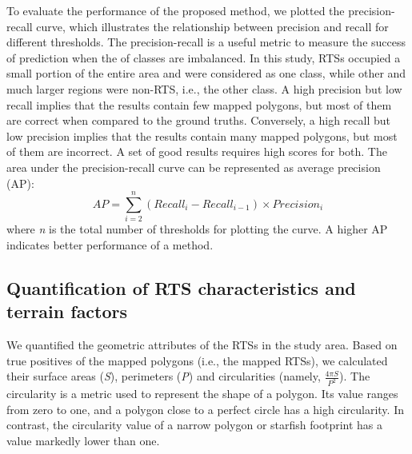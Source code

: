 \documentclass[authoryear,preprint,review,12pt]{elsarticle}
\begin{document}
To evaluate the performance of the proposed method, we plotted the precision-recall curve, which illustrates the relationship between precision and recall for different  thresholds. The precision-recall is a useful metric to measure the success of prediction when the  of classes are imbalanced. In this study, RTSs occupied a small portion of the entire area and were considered as one class, while other and much larger regions were non-RTS, i.e., the other class. A high precision but low recall implies that the results contain few mapped polygons, but most of them are correct when compared to the ground truths. Conversely, a high recall but low precision implies that the results contain many mapped polygons, but most of them are incorrect. A set of good results requires high scores for both. The area under the precision-recall curve can be represented as average precision (AP):
\begin{equation}
AP=\sum_{i=2}^{n} (Recall_i - Recall_{i-1})\times Precision_i 
\label{equ_ap}
\end{equation}
where \emph{n} is the total number of thresholds for plotting the curve. A higher AP indicates better performance of a method.


\subsection{Quantification of RTS characteristics and terrain factors}
\label{subsec_quantify_rts}

We quantified the geometric attributes of the RTSs in the study area. Based on true positives of the mapped polygons (i.e., the mapped RTSs), we calculated their surface areas (\emph{S}), perimeters (\emph{P}) and circularities (namely, $\frac{4 \pi S}{P^2} $). The circularity is a metric used to represent the shape of a polygon. Its value ranges from zero to one, and a polygon close to a perfect circle has a high circularity. In contrast, the circularity value of a narrow polygon or starfish footprint has a value markedly lower than one. 
\end{document}
